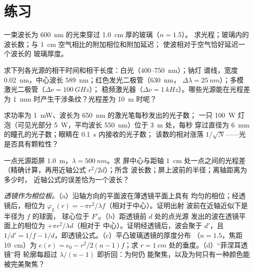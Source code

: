 \section{练习}

\begin{exercise}[$\star$]\label{exo:b2:scalar-light-model:1}
一束波长为 \qty{600}{nm} 的光束穿过 \qty{1.0}{cm} 厚的玻璃（$n = 1.5$）。
求光程；玻璃内的波长数；与 \qty{1}{cm} 空气相比的附加相位和附加延迟；
使波相对于空气恰好延迟一个波长的
玻璃厚度。
\end{exercise}

\begin{exercise}[$\star$]\label{exo:b2:scalar-light-model:2}
求下列各光源的相干时间和相干长度：白光（$400$--\qty{750}{nm}）；钠灯
谱线，宽度 \qty{0.02}{nm}，中心波长 \qty{589}{nm}；红色发光二极管（\qty{630}{nm}，
$\Delta\lambda = \qty{25}{nm}$）；多模激光二极管（$\Delta\nu = \qty{100}{GHz}$）；
稳频激光器（$\Delta\nu = \qty{1}{kHz}$）。哪些光源能在光程差为
\qty{1}{mm} 时产生干涉条纹？光程差为 \qty{10}{m} 时呢？
\end{exercise}

\begin{exercise}[$\star$]\label{exo:b2:scalar-light-model:3}
求功率为 \qty{1}{mW}、波长为 \qty{650}{nm} 的激光笔每秒发出的光子数；
一只 \qty{100}{W} 灯泡（可见光部分 \qty{5}{W}，平均波长 \qty{550}{nm}）位于 \qty{3}{m} 处，每秒
穿过直径为 \qty{6}{mm} 的瞳孔的光子数；眼睛在 \qty{0.1}{s} 内接收的光子数；
该数的相对涨落 $1/\sqrt N$——光是否具有颗粒性？
\end{exercise}

\begin{exercise}[$\star$]\label{exo:b2:scalar-light-model:4}
一点光源距屏 \qty{1.0}{m}，$\lambda = \qty{500}{nm}$。求
屏中心与距轴 \qty{1}{cm} 处一点之间的光程差
（精确计算，再用近轴公式 $r^2/2d$）；所含
波长数；屏上波前的半径；离轴距离为多少时，
近轴公式的误差恰为一个波长？
\end{exercise}

\begin{exercise}[$\star\star$]\label{exo:b2:scalar-light-model:5}
\emph{透镜作为相位板。}（a）沿轴方向的平面波在薄透镜平面上具有
均匀的相位；经透镜后，相位为
$\varphi_L(r) = -\pi r^2/\lambda f$（相对于中心）。证明出射
波前在近轴近似下是半径为 $f$ 的球面，
球心位于 $F'$。（b）距透镜前 $d$ 处的点光源
发出的波在透镜平面上的相位为 $+\pi r^2/\lambda d$（相对于
中心）。证明经透镜后，波会聚于 $d'$，且
$1/d' = 1/f - 1/d$，即透镜公式。（c）平凸玻璃透镜的厚度分布
（$n = 1.5$，焦距 \qty{10}{cm}）为 $e(r) =
e_0 - r^2/2(n - 1)f$；求 $r = \qty{1}{cm}$ 处的垂度。（d）“菲涅耳透镜”将
轮廓每超过 $\lambda/(n - 1)$ 即折回：为何仍
能聚焦，以及为何只有一种颜色能被完美聚焦？
\end{exercise}

